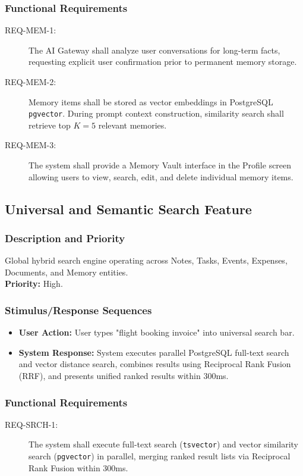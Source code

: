 \documentclass[11pt,a4paper]{article}
\begin{document}
\subsubsection{Functional Requirements}
\begin{description}
    \item[REQ-MEM-1:] The AI Gateway shall analyze user conversations for long-term facts, requesting explicit user confirmation prior to permanent memory storage.
    \item[REQ-MEM-2:] Memory items shall be stored as vector embeddings in PostgreSQL \texttt{pgvector}. During prompt context construction, similarity search shall retrieve top $K=5$ relevant memories.
    \item[REQ-MEM-3:] The system shall provide a Memory Vault interface in the Profile screen allowing users to view, search, edit, and delete individual memory items.
\end{description}

\subsection{Universal and Semantic Search Feature}
\subsubsection{Description and Priority}
Global hybrid search engine operating across Notes, Tasks, Events, Expenses, Documents, and Memory entities. \\
\textbf{Priority:} High.

\subsubsection{Stimulus/Response Sequences}
\begin{itemize}
    \item \textbf{User Action:} User types "flight booking invoice" into universal search bar.
    \item \textbf{System Response:} System executes parallel PostgreSQL full-text search and vector distance search, combines results using Reciprocal Rank Fusion (RRF), and presents unified ranked results within 300ms.
\end{itemize}

\subsubsection{Functional Requirements}
\begin{description}
    \item[REQ-SRCH-1:] The system shall execute full-text search (\texttt{tsvector}) and vector similarity search (\texttt{pgvector}) in parallel, merging ranked result lists via Reciprocal Rank Fusion within 300ms.
\end{description}
\end{document}
